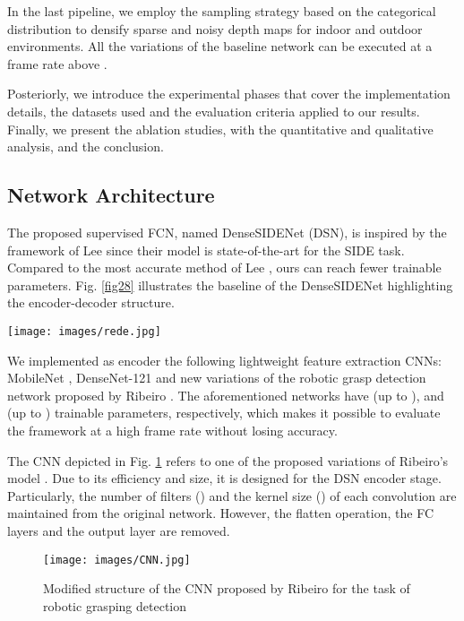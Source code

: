 \documentclass[5p]{elsarticle}
\begin{document}
In the last pipeline, we employ the sampling strategy based on the categorical distribution to densify sparse and noisy depth maps for indoor and outdoor environments. All the variations of the baseline network can be executed at a frame rate above . 

Posteriorly, we introduce the experimental phases that cover the implementation details, the datasets used and the evaluation criteria applied to our results. Finally, we present the ablation studies, with the quantitative and qualitative analysis, and the conclusion.

\subsection{Network Architecture}

The proposed supervised FCN, named  DenseSIDENet (DSN), is inspired by the framework of Lee \etal\cite{lee2019big} since their model is state-of-the-art for the SIDE task. Compared to the most accurate method of Lee \etal\cite{lee2019big}, ours can reach  fewer trainable parameters. Fig. \ref{fig28} illustrates the baseline of the DenseSIDENet highlighting the encoder-decoder structure.

\begin{figure*}[]
\centering
\texttt{[image: images/rede.jpg]}  
\caption{Proposed baseline of the DenseSIDENet}
\label{fig28}
\end{figure*}

We implemented as encoder the following lightweight feature extraction CNNs: MobileNet \cite{sandler2018mobilenetv2}, DenseNet-121 \cite{huang2017densely} and new variations of the robotic grasp detection network proposed by Ribeiro \etal \cite{ribeiro2019fast}. The aforementioned networks have  (up to ),  and  (up to ) trainable parameters, respectively, which makes it possible to evaluate the framework at a high frame rate without losing accuracy.

The CNN depicted in Fig. \ref{figgrasp} refers to one of the proposed variations of Ribeiro's model \cite{ribeiro2019fast}. Due to its efficiency and size, it is designed for the DSN encoder stage. Particularly, the number of filters () and the kernel size () of each convolution are maintained from the original network. However, the flatten operation, the FC layers and the output layer are removed. 

\begin{figure}[]
\centering
\texttt{[image: images/CNN.jpg]}\\  
\caption{Modified structure of the CNN proposed by Ribeiro \etal \cite{ribeiro2019fast} for the task of robotic grasping detection} 
\label{figgrasp}
\end{figure}
\end{document}
